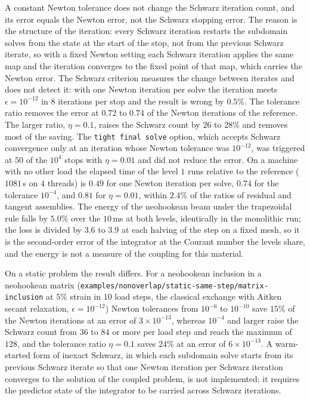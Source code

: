 \documentclass[11pt]{article}
\newcommand{\code}[1]{\texttt{#1}}
\begin{document}
A constant Newton tolerance does not change the Schwarz iteration count,
and its error equals the Newton error, not the Schwarz stopping error. The
reason is the structure of the iteration: every Schwarz iteration restarts
the subdomain solves from the state at the start of the stop, not from the
previous Schwarz iterate, so with a fixed Newton setting each Schwarz
iteration applies the same map and the iteration converges to the fixed
point of that map, which carries the Newton error. The Schwarz criterion
measures the change between iterates and does not detect it: with one Newton
iteration per solve the iteration meets $\epsilon = 10^{-12}$ in $8$
iterations per stop and the result is wrong by $0.5\%$. The tolerance
ratio removes the error at $0.72$ to $0.74$ of the Newton iterations of the
reference. The larger ratio, $\eta = 0.1$, raises the Schwarz count by
$26$ to $28\%$ and removes most of the saving. The \code{tight final solve}
option, which
accepts Schwarz convergence only at an iteration whose Newton tolerance was
$10^{-12}$, was triggered at $50$ of the $10^4$ stops with $\eta = 0.01$
and did not reduce the error. On a machine with no other load the elapsed
time of the level $1$ runs relative to the reference ($1081$\,s on $4$ threads)
is $0.49$ for one Newton iteration per solve, $0.74$ for the tolerance
$10^{-4}$, and $0.81$ for $\eta = 0.01$, within $2.4\%$ of the ratios of
residual and tangent assemblies. The energy of the neohookean beam under
the trapezoidal rule falls by $5.0\%$ over the $10$\,ms at both levels,
identically in the monolithic run; the loss is divided by $3.6$ to $3.9$
at each halving of the step on a fixed mesh, so it is the second-order
error of the integrator at the Courant number the levels share, and the
energy is not a measure of the coupling for this material.

On a static problem the result differs. For a neohookean inclusion in a
neohookean matrix (\code{examples/nonoverlap/static-same-step/matrix-inclusion}
at $5\%$ strain in $10$ load steps, the classical exchange with Aitken
secant relaxation, $\epsilon = 10^{-12}$) Newton tolerances from $10^{-6}$
to $10^{-10}$ save $15\%$ of the Newton iterations at an error of
$3\times 10^{-13}$, whereas $10^{-4}$ and larger raise the Schwarz count
from $36$ to $84$ or more per load step and reach the maximum of $128$, and the
tolerance ratio $\eta = 0.1$ saves $24\%$ at an error of
$6\times 10^{-13}$. A warm-started form of inexact Schwarz, in which each
subdomain solve starts from its previous Schwarz iterate so that one
Newton iteration per Schwarz iteration converges to the solution of the
coupled problem, is not implemented; it requires the predictor state
of the integrator to be carried across Schwarz iterations.
\end{document}
